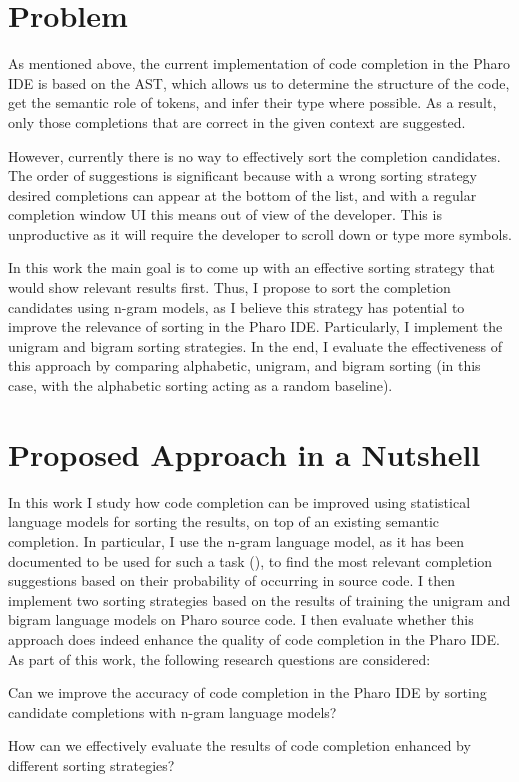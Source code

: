 \section{Problem}
\label{sec:Introduction-Problem}
As mentioned above, the current implementation of code completion in the Pharo IDE is based on the AST, which allows us to determine the structure of the code, get the semantic role of tokens, and infer their type where possible. As a result, only those completions that are correct in the given context are suggested.

However, currently there is no way to effectively sort the completion candidates. The order of suggestions is significant because with a wrong sorting strategy desired completions can appear at the bottom of the list, and with a regular completion window UI this means out of view of the developer. This is unproductive as it will require the developer to scroll down or type more symbols. 

In this work the main goal is to come up with an effective sorting strategy that would show relevant results first. Thus, I propose to sort the completion candidates using n-gram models, as I believe this strategy has potential to improve the relevance of sorting in the Pharo IDE. Particularly, I implement the unigram and bigram sorting strategies. In the end, I evaluate the effectiveness of this approach by comparing alphabetic, unigram, and bigram sorting (in this case, with the alphabetic sorting acting as a random baseline).

\section{Proposed Approach in a Nutshell}
\label{sec:Introduction-Approach}
In this work I study how code completion can be improved using statistical language models for sorting the results, on top of an existing semantic completion. In particular, I use the n-gram language model, as it has been documented to be used for such a task (\cite{Hind12a}), to find the most relevant completion suggestions based on their probability of occurring in source code. I then implement two sorting strategies based on the results of training the unigram and bigram language models on Pharo source code. I then evaluate whether this approach does indeed enhance the quality of code completion in the Pharo IDE. As part of this work, the following research questions are considered:
\begin{RQ}
    \item Can we improve the accuracy of code completion in the Pharo IDE by sorting candidate completions with n-gram language models?
    \item How can we effectively evaluate the results of code completion enhanced by different sorting strategies?
\end{RQ}

